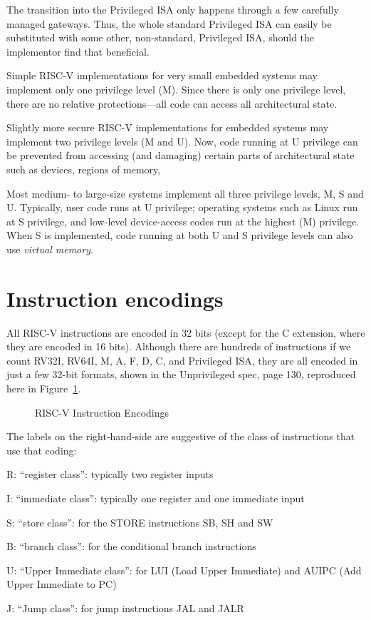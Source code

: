 The transition into the Privileged ISA only happens through a few
carefully managed gateways.  Thus, the whole standard Privileged ISA
can easily be substituted with some other, non-standard, Privileged
ISA, should the implementor find that beneficial.

Simple RISC-V implementations for very small embedded systems may
implement only one privilege level (M).  Since there is only one
privilege level, there are no relative protections---all code can
access all architectural state.

Slightly more secure RISC-V implementations for embedded systems may
implement two privilege levels (M and U).  Now, code running at U
privilege can be prevented from accessing (and damaging) certain parts
of architectural state such as devices, regions of memory, {\etc}

Most medium- to large-size systems implement all three privilege
levels, M, S and U.  Typically, user code runs at U privilege;
operating systems such as Linux run at S privilege, and low-level
device-access codes run at the highest (M) privilege.  When S is
implemented, code running at both U and S privilege levels can also
use \emph{virtual memory}.


\section{Instruction encodings}

\label{Sec_Instruction_Encodings}

All RISC-V instructions are encoded in 32 bits (except for the C
extension, where they are encoded in 16 bits).  Although there are
hundreds of instructions if we count RV32I, RV64I, M, A, F, D, C, and
Privileged ISA, they are all encoded in just a few 32-bit formats,
shown in the Unprivileged spec, page 130, reproduced here in
Figure~\ref{Fig_Instr_Encodings}.
\begin{figure}[htbp]
  \centerline{}
  \caption{\label{Fig_Instr_Encodings} RISC-V Instruction Encodings}
\end{figure}
The labels on the right-hand-side are suggestive of the class of
instructions that use that coding:
\begin{tightlist}
  \item R: ``register class'': typically two register inputs
  \item I: ``immediate class'': typically one register and one immediate input
  \item S: ``store class'': for the STORE instructions SB, SH and SW
  \item B: ``branch class'': for the conditional branch instructions
  \item U: ``Upper Immediate class'': for LUI (Load Upper Immediate)
        and AUIPC (Add Upper Immediate to PC)
  \item J: ``Jump class'': for jump instructions JAL and JALR
\end{tightlist}

